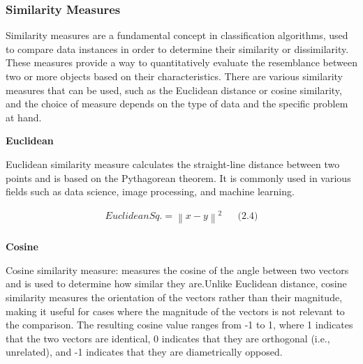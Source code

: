 \documentclass{article}
\begin{document}
{                \subsubsection{Similarity Measures}
                    \hspace{0.5cm}Similarity measures are a fundamental concept in classification algorithms, used to compare data instances in order to determine their similarity or dissimilarity. These measures provide a way to quantitatively evaluate the resemblance between two or more objects based on their characteristics. There are various similarity measures that can be used, such as the Euclidean distance or cosine similarity, and the choice of measure depends on the type of data and the specific problem at hand.\par
                    
                    \textbf{Euclidean}\par
                    \vspace*{1\baselineskip}

                    Euclidean similarity measure calculates the straight-line distance between two points and is based on the Pythagorean theorem. It is commonly used in various fields such as data science, image processing, and machine learning.\par
                    
                    \begin{align*}
                        Euclidean Sq. = \left\lVert x - y \right\rVert^2 && \text{(2.4)} \\ 
                    \end{align*}
                    \vspace*{2\baselineskip}
                    
                    \textbf{Cosine}\par
                    \vspace*{1\baselineskip}

                    Cosine similarity measure: measures the cosine of the angle between two vectors and is used to determine how similar they are.Unlike Euclidean distance, cosine similarity measures the orientation of the vectors rather than their magnitude, making it useful for cases where the magnitude of the vectors is not relevant to the comparison. The resulting cosine value ranges from -1 to 1, where 1 indicates that the two vectors are identical, 0 indicates that they are orthogonal (i.e., unrelated), and -1 indicates that they are diametrically opposed.\par
                    
}
\end{document}
